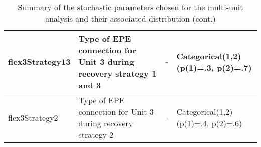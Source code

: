 \begin{table}
\begin{center}
\begin{tabular}{ | l | p{5cm} | c | p{5cm} |}
         flex3Strategy13    & Type of EPE connection for Unit 3 during recovery strategy 1 and 3  & -      & Categorical(1,2) (p(1)=.3, p(2)=.7)             \\ \hline
         flex3Strategy2     & Type of EPE connection for Unit 3 during recovery strategy 2        & -      & Categorical(1,2) (p(1)=.4, p(2)=.6)             \\ 
        \hline
      \end{tabular}
  \end{center}
  \caption{Summary of the stochastic parameters chosen for the multi-unit analysis and their associated distribution (cont.)}
  \label{tab:stochasticParameters2}
\end{table}


